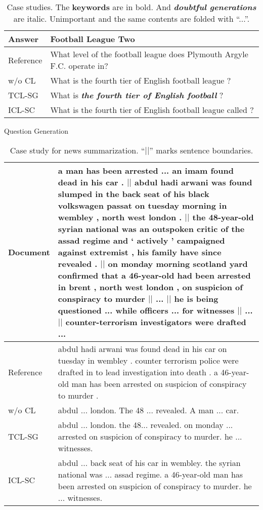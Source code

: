 \begin{table}[t!]
\begin{subtable}{\linewidth}
\begin{tabular}{p{0.9cm}p{6.2cm}}
			\hline	
			Answer & Football League Two\\
			\hline
			{Reference} & What level of the football league does Plymouth Argyle F.C. operate in?\\
			\hline
			w/o CL & What is the fourth tier of English football league ?\\
			\hline
			TCL-SG & What is \textit{\textbf{the fourth tier of English football }}?\\
			\hline
			ICL-SC & What is the fourth tier of English football league called ? \\
			\bottomrule[1pt]
		\end{tabular}
		\caption{Question Generation}
		\label{tab:caseqg}
	\end{subtable}

	\caption{Case studies. 
		The \textbf{keywords} are in bold. And \textbf{\textit{doubtful generations}} are italic. Unimportant and the same contents are folded with ``...''. }
	\label{tab:cases}
\end{table}

\begin{table}
	\scriptsize
	\centering
	\begin{tabular}{p{0.9cm}p{6.2cm}}
		\toprule[1pt]
		{Document} & {a man has been arrested ... an imam found dead in his car . $||$ abdul hadi arwani was found slumped in the back seat of his black volkswagen passat on tuesday morning in wembley , north west london . $||$ the 48-year-old syrian national was an outspoken critic of the assad regime and ` actively ' campaigned against extremist , his family have since revealed . $||$ on monday morning scotland yard confirmed that a 46-year-old had been arrested in brent , north west london , on suspicion of conspiracy to murder $||$ ... $||$ he is being questioned ... while officers ... for witnesses $||$ ... $||$ counter-terrorism investigators were drafted ...}\\
		\hline
		{Reference} & abdul hadi arwani was found dead in his car on tuesday in wembley . counter terrorism police were drafted in to lead investigation into death . a 46-year-old man has been arrested on suspicion of conspiracy to murder .\\
		\hline
		w/o CL & abdul  ...  london. The 48 ... revealed. A man ... car.\\
		\hline
		TCL-SG & abdul ... london. the 48... revealed. on monday ... arrested on suspicion of conspiracy to murder. he ... witnesses.\\
		\hline
		ICL-SC & abdul ... back seat of his car in wembley. the syrian national was ... assad regime. a 46-year-old man has been arrested on suspicion of conspiracy to murder. he ... witnesses. \\
		\bottomrule[1pt]
	\end{tabular}
	\caption{Case study for news summarization. ``$||$'' marks sentence boundaries. }
	\label{tab:casens}
\end{table}



